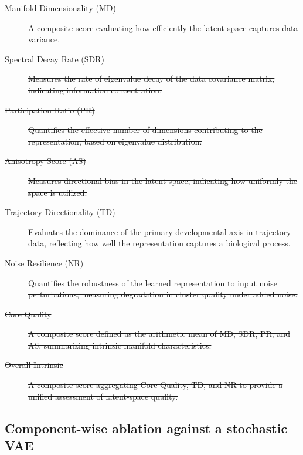 \documentclass[referee, pdflatex, sn-vancouver-num]{sn-jnl}
\providecommand{\DIFdeltex}[1]{{\protect\color{red}\sout{#1}}}                      %
\providecommand{\DIFaddbegin}{} %
\providecommand{\DIFaddend}{} %
\providecommand{\DIFdelbegin}{} %
\providecommand{\DIFdelend}{} %
\providecommand{\DIFdel}[1]{\texorpdfstring{\DIFdeltex{#1}}{}} %
\newcommand{\DIFscaledelfig}{0.5}
\newlength{\DIFdelgraphicswidth} %
\newlength{\DIFdelgraphicsheight} %
\newcommand{\DIFaddincludegraphics}[2][]{{\color{blue}\fbox{\DIFOincludegraphics[#1]{#2}}}} %
\newcommand{\DIFdelincludegraphics}[2][]{%
\sbox{\DIFdelgraphicsbox}{\DIFOincludegraphics[#1]{#2}}%
\settoboxwidth{\DIFdelgraphicswidth}{\DIFdelgraphicsbox} %
\settoboxtotalheight{\DIFdelgraphicsheight}{\DIFdelgraphicsbox} %
\scalebox{\DIFscaledelfig}{%
\parbox[b]{\DIFdelgraphicswidth}{\usebox{\DIFdelgraphicsbox}\\[-\baselineskip] \rule{\DIFdelgraphicswidth}{0em}}\llap{\resizebox{\DIFdelgraphicswidth}{\DIFdelgraphicsheight}{%
\setlength{\unitlength}{\DIFdelgraphicswidth}%
\begin{picture}(1,1)%
\thicklines\linethickness{2pt} %
{\color[rgb]{1,0,0}\put(0,0){\framebox(1,1){}}}%
{\color[rgb]{1,0,0}\put(0,0){\line( 1,1){1}}}%
{\color[rgb]{1,0,0}\put(0,1){\line(1,-1){1}}}%
\end{picture}%
}\hspace*{3pt}}} %
} %
\DeclareRobustCommand{\DIFaddbegin}{\DIFOaddbegin \let\includegraphics\DIFaddincludegraphics} %
\DeclareRobustCommand{\DIFaddend}{\DIFOaddend \let\includegraphics\DIFOincludegraphics} %
\DeclareRobustCommand{\DIFdelbegin}{\DIFOdelbegin \let\includegraphics\DIFdelincludegraphics} %
\DeclareRobustCommand{\DIFdelend}{\DIFOaddend \let\includegraphics\DIFOincludegraphics} %
\begin{document}
\DIFdelbegin %
\begin{description}%
\item[\DIFdel{Manifold Dimensionality (MD)}]%
\DIFdel{A composite score evaluating how efficiently the latent space captures data variance.
    }%
\item[\DIFdel{Spectral Decay Rate (SDR)}]%
\DIFdel{Measures the rate of eigenvalue decay of the data covariance matrix, indicating information concentration.
    }%
\item[\DIFdel{Participation Ratio (PR)}]%
\DIFdel{Quantifies the effective number of dimensions contributing to the representation, based on eigenvalue distribution. }%
\item[\DIFdel{Anisotropy Score (AS)}]%
\DIFdel{Measures directional bias in the latent space, indicating how uniformly the space is utilized.}%
\item[\DIFdel{Trajectory Directionality (TD)}]%
\DIFdel{Evaluates the dominance of the primary developmental axis in trajectory data, reflecting how well the representation captures a biological process.
    }%
\item[\DIFdel{Noise Resilience (NR)}]%
\DIFdel{Quantifies the robustness of the learned representation to input noise perturbations, measuring degradation in cluster quality under added noise.
    }%
\item[\DIFdel{Core Quality}]%
\DIFdel{A composite score defined as the arithmetic mean of MD, SDR, PR, and AS, summarizing intrinsic manifold characteristics.
    }%
\item[\DIFdel{Overall Intrinsic}]%
\DIFdel{A composite score aggregating Core Quality, TD, and NR to provide a unified assessment of latent-space quality.
}
\end{description}%
\DIFdelend \DIFaddbegin \subsection{Component-wise ablation against a stochastic VAE}\label{sec:ablation}
\DIFaddend
\end{document}
